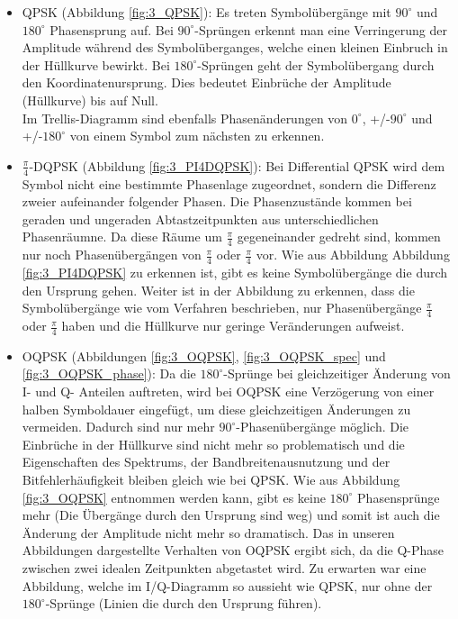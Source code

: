 \documentclass[12pt,a4paper,ngerman]{article}
\begin{document}
\begin{itemize}
\item QPSK (Abbildung \ref{fig:3_QPSK}): Es treten Symbolübergänge mit $90^\circ$ und $180^\circ$ Phasensprung auf. Bei $90^\circ$-Sprüngen erkennt man eine Verringerung der Amplitude während des Symbolüberganges, welche einen kleinen Einbruch in der Hüllkurve bewirkt. Bei $180^\circ$-Sprüngen geht der Symbolübergang durch den Koordinatenursprung. Dies bedeutet Einbrüche der Amplitude (Hüllkurve) bis auf Null.\\
Im Trellis-Diagramm sind ebenfalls Phasenänderungen von $0^\circ$, +/-$90^\circ$ und +/-$180^\circ$ von einem Symbol zum nächsten zu erkennen.
\item $\frac{\pi}{4}$-DQPSK (Abbildung \ref{fig:3_PI4DQPSK}): Bei Differential QPSK wird dem Symbol nicht eine bestimmte Phasenlage zugeordnet, sondern die Differenz zweier aufeinander folgender Phasen. Die Phasenzustände kommen bei geraden und ungeraden Abtastzeitpunkten aus unterschiedlichen Phasenräumne. Da diese Räume um  $\frac{\pi}{4}$ gegeneinander gedreht sind, kommen nur noch Phasenübergängen von  $\frac{\pi}{4}$ oder  $\frac{\pi}{4}$ vor. Wie aus Abbildung Abbildung \ref{fig:3_PI4DQPSK} zu erkennen ist, gibt es keine Symbolübergänge die durch den Ursprung gehen. Weiter ist in der Abbildung zu erkennen, dass die Symbolübergänge wie vom Verfahren beschrieben, nur Phasenübergänge $\frac{\pi}{4}$ oder  $\frac{\pi}{4}$ haben und die Hüllkurve nur geringe Veränderungen aufweist. 
\item OQPSK (Abbildungen \ref{fig:3_OQPSK}, \ref{fig:3_OQPSK_spec} und \ref{fig:3_OQPSK_phase}): Da die $180^\circ$-Sprünge bei gleichzeitiger Änderung von I- und Q- Anteilen auftreten, wird bei OQPSK eine Verzögerung von einer halben Symboldauer eingefügt, um diese gleichzeitigen Änderungen zu vermeiden. Dadurch sind nur mehr $90^\circ$-Phasenübergänge möglich. Die Einbrüche in der Hüllkurve sind nicht mehr so problematisch und die Eigenschaften des Spektrums, der Bandbreitenausnutzung und der Bitfehlerhäufigkeit bleiben gleich wie bei QPSK. Wie aus Abbildung \ref{fig:3_OQPSK} entnommen werden kann, gibt es keine $180^\circ$ Phasensprünge mehr (Die Übergänge durch den Ursprung sind weg) und somit ist auch die Änderung der Amplitude nicht mehr so dramatisch. Das in unseren Abbildungen dargestellte Verhalten von OQPSK ergibt sich, da die Q-Phase zwischen zwei idealen Zeitpunkten abgetastet wird. Zu erwarten war eine Abbildung, welche im I/Q-Diagramm so aussieht wie QPSK, nur ohne der $180^\circ$-Sprünge (Linien die durch den Ursprung führen).

\end{itemize}
\end{document}
